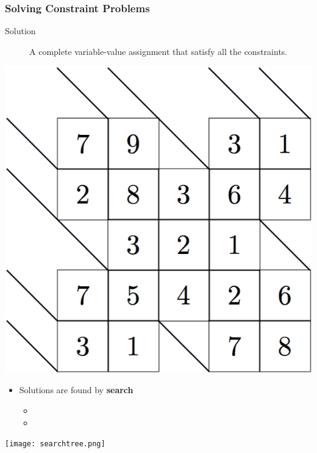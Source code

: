\documentclass{beamer}
\begin{document}
\begin{frame}
  \frametitle{Solving Constraint Problems}
  \begin{minipage}{0.50\textwidth}
    \begin{description}
    \item[Solution]
      A complete
      variable-value assignment that satisfy all the constraints.
    \end{description}
  \end{minipage}
  \begin{minipage}{0.45\textwidth}
    \includegraphics[scale=0.15]{kakuro-sol.png} \\
  \end{minipage}
  
  \begin{minipage}{0.5\textwidth}
    \begin{itemize}
    \item Solutions are found by \textbf{search}
      \begin{itemize}
      \item {}
      \item {}
      \end{itemize}
    \end{itemize}
  \end{minipage}
  \begin{minipage}{0.45\textwidth}
    \texttt{[image: searchtree.png]}
  \end{minipage}
\end{frame}
\end{document}
